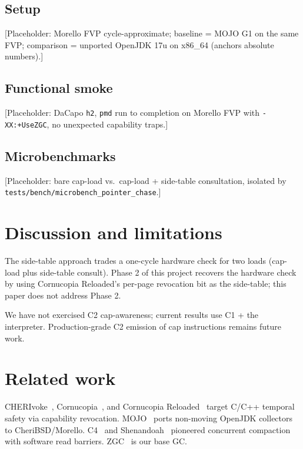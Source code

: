\documentclass[acmsmall,nonacm]{acmart}
\begin{document}
\subsection{Setup}

[Placeholder: Morello FVP cycle-approximate; baseline = MOJO G1 on
the same FVP; comparison = unported OpenJDK 17u on x86\_64 (anchors
absolute numbers).]

\subsection{Functional smoke}

[Placeholder: DaCapo \texttt{h2}, \texttt{pmd} run to completion on
Morello FVP with \texttt{-XX:+UseZGC}, no unexpected capability traps.]

\subsection{Microbenchmarks}

[Placeholder: bare cap-load vs.\ cap-load + side-table consultation,
isolated by \texttt{tests/bench/microbench\_pointer\_chase}.]

\section{Discussion and limitations}
\label{sec:disc}

The side-table approach trades a one-cycle hardware check for two
loads (cap-load plus side-table consult). Phase 2 of this project
recovers the hardware check by using Cornucopia Reloaded's per-page
revocation bit as the side-table; this paper does not address Phase 2.

We have not exercised C2 cap-awareness; current results use C1 + the
interpreter. Production-grade C2 emission of cap instructions remains
future work.

\section{Related work}
\label{sec:related}

CHERIvoke~\cite{cherivoke}, Cornucopia~\cite{cornucopia}, and
Cornucopia Reloaded~\cite{cornucopia-reloaded} target C/C++ temporal
safety via capability revocation. MOJO~\cite{mojo-jvm} ports
non-moving OpenJDK collectors to CheriBSD/Morello. C4~\cite{c4} and
Shenandoah~\cite{shenandoah} pioneered concurrent compaction with
software read barriers. ZGC~\cite{zgc-toplas} is our base GC.
\end{document}
